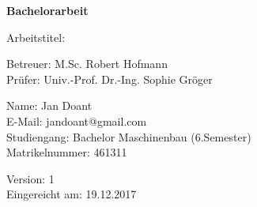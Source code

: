 \begin{titlepage}
		\begin{center}	
		
		\vspace{1.5cm}
		
		{\huge\textbf{Bachelorarbeit}}
		
		\vspace{1.5cm}
		
		{\large Arbeitstitel:}\\
		{\large\textbf{\mytitle}}
		
		\vspace{1.5cm}
		
		Betreuer: M.Sc. Robert Hofmann\\
		Prüfer: Univ.-Prof. Dr.-Ing. Sophie Gröger		
		
		\vfill
		
			
		
	\end{center}
	
	\begin{flushleft}
		Name: Jan Doant\\		
		E-Mail: jandoant@gmail.com\\
		Studiengang: Bachelor Maschinenbau (6.Semester)\\
		Matrikelnummer: 461311\linebreak
		
		Version: 1\\
		Eingereicht am: 19.12.2017
		
	\end{flushleft}
	
	
\end{titlepage}